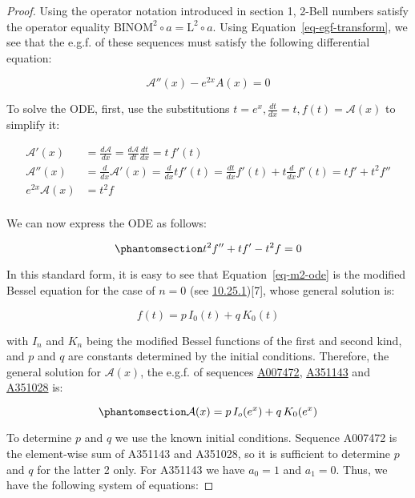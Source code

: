\documentclass[
  letterpaper,
  DIV=11,
  numbers=noendperiod]{scrartcl}
\theoremstyle{plain}
\theoremstyle{remark}
\begin{document}
\begin{proof}
Using the operator notation introduced in section 1, 2-Bell numbers
satisfy the operator equality
\(\mathrm{BINOM}^2 \circ a = \mathrm{L}^2 \circ a\). Using
Equation~\ref{eq-egf-transform}, we see that the e.g.f. of these
sequences must satisfy the following differential equation:

\[
\mathcal{A}''(x)-e^{2x}A(x) =0
\]

To solve the ODE, first, use the substitutions
\(t=e^x, \frac{dt}{dx}=t, f(t)=\mathcal{A}(x)\) to simplify it:

\[
\begin{aligned}
\mathcal{A}'(x) & = \frac{d\mathcal{A}}{dx}=\frac{d\mathcal{A}}{dt}\frac{dt}{dx} = t \,f'(t) \\
\mathcal{A}''(x) &= \frac{d}{dx}\mathcal{A}'(x) = \frac{d}{dx}t f'(t) = \frac{dt}{dx} f'(t) + t \frac{d}{dx}f'(t) = t f'+t^2 f'' \\
e^{2x} \mathcal{A}(x) &= t^2f\\
\end{aligned}
\]

We can now express the ODE as follows:

\begin{equation}\phantomsection\label{eq-m2-ode}{
t^2f''+tf'-t^2f = 0
}\end{equation}

In this standard form, it is easy to see that Equation~\ref{eq-m2-ode}
is the modified Bessel equation for the case of \(n=0\) (see
\href{https://dlmf.nist.gov/10.25.E1}{10.25.1}){[}7{]}, whose general
solution is:

\[
f(t)=p\,I_0(t)+q\,K_0(t)
\]

with \(I_n\) and \(K_n\) being the modified Bessel functions of the
first and second kind, and \(p\) and \(q\) are constants determined by
the initial conditions. Therefore, the general solution for
\(\mathcal{A}(x)\), the e.g.f. of sequences
\href{https://oeis.org/A007472}{A007472},
\href{https://oeis.org/A351143}{A351143} and
\href{https://oeis.org/A351028}{A351028} is:

\begin{equation}\phantomsection\label{eq-m2-ODE-solution}{
\mathcal{A}(x)=p\, I_o(e^x) + q\,K_0(e^x)
}\end{equation}

To determine \(p\) and \(q\) we use the known initial conditions.
Sequence A007472 is the element-wise sum of A351143 and A351028, so it
is sufficient to determine \(p\) and \(q\) for the latter 2 only. For
A351143 we have \(a_0 = 1\) and \(a_1 = 0\). Thus, we have the following
system of equations:


\end{proof}
\end{document}
